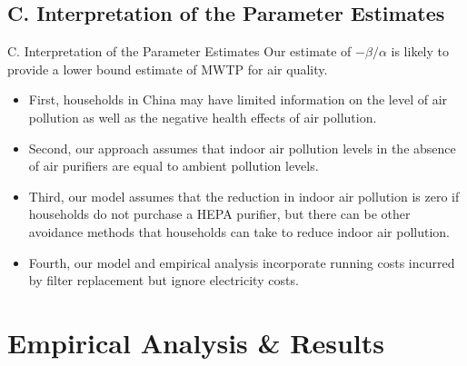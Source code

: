 \documentclass{beamer}
\begin{document}
\subsection{C. Interpretation of the Parameter Estimates}
\begin{frame}[shrink]
	\transfade %
	\tableofcontents[sectionstyle=show/shaded,subsectionstyle=show/shaded/hide]
	\addtocounter{framenumber}{-1}
\end{frame}
\begin{frame}{C. Interpretation of the Parameter Estimates}
	Our estimate of $-\beta/\alpha$ is likely to provide a lower bound estimate of MWTP for air quality.
	\begin{itemize}
		\item First, households in China may have limited information on the level of air pollution as well as the negative health effects of air pollution.
		\item Second, our approach assumes that indoor air pollution levels in the absence of air purifiers are equal to ambient pollution levels.
		\item Third, our model assumes that the reduction in indoor air pollution is zero if households do not purchase a HEPA purifier, but there can be other avoidance methods that households can take to reduce indoor air pollution.
		\item Fourth, our model and empirical analysis incorporate running costs incurred by filter replacement but ignore electricity costs.
	\end{itemize}
\end{frame}

\section{Empirical Analysis \& Results}
\begin{frame}[shrink]
	\transfade
	\tableofcontents[sectionstyle=show/shaded,subsectionstyle=show/shaded/hide]
	\addtocounter{framenumber}{-1}
\end{frame}
\end{document}
